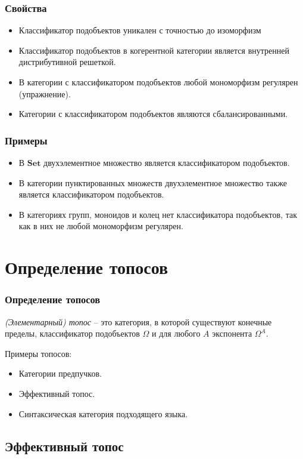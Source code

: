 \documentclass{beamer}
\theoremstyle{definition}
\newcommand{\cat}[1]{\mathbf{#1}}
\newcommand{\Set}{\cat{Set}}
\begin{document}
\begin{frame}
\frametitle{Свойства}
\begin{itemize}
\item Классификатор подобъектов уникален с точностью до изоморфизм
\item Классификатор подобъектов в когерентной категории является внутренней дистрибутивной решеткой.
\item В категории с классификатором подобъектов любой мономорфизм регулярен (упражнение).
\item Категории с классификатором подобъектов являются сбалансированными.
\end{itemize}
\end{frame}

\begin{frame}
\frametitle{Примеры}
\begin{itemize}
\item В $\Set$ двухэлементное множество является классификатором подобъектов.
\item В категории пунктированных множеств двухэлементное множество также является классификатором подобъектов.
\item В категориях групп, моноидов и колец нет классификатора подобъектов, так как в них не любой мономорфизм регулярен.
\end{itemize}
\end{frame}

\section{Определение топосов}

\begin{frame}
\frametitle{Определение топосов}
\begin{defn}
\emph{(Элементарный) топос} -- это категория, в которой существуют конечные пределы, классификатор подобъектов $\Omega$ и для любого $A$ экспонента $\Omega^A$.
\end{defn}

Примеры топосов:
\begin{itemize}
\item Категории предпучков.
\item Эффективный топос.
\item Синтаксическая категория подходящего языка.
\end{itemize}
\end{frame}

\subsection{Эффективный топос}
\end{document}
